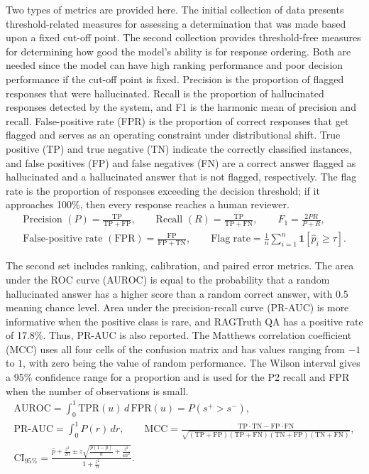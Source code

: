 \documentclass[a4paper,fleqn]{cas-sc}
\begin{document}
Two types of metrics are provided here. The initial collection of data presents threshold-related measures for assessing a determination that was made based upon a fixed cut-off point. The second collection provides threshold-free measures for determining how good the model's ability is for response ordering. Both are needed since the model can have high ranking performance and poor decision performance if the cut-off point is fixed. Precision is the proportion of flagged responses that were hallucinated. Recall is the proportion of hallucinated responses detected by the system, and F1 is the harmonic mean of precision and recall. False-positive rate (FPR) is the proportion of correct responses that get flagged and serves as an operating constraint under distributional shift. True positive (TP) and true negative (TN) indicate the correctly classified instances, and false positives (FP) and false negatives (FN) are a correct answer flagged as hallucinated and a hallucinated answer that is not flagged, respectively. The flag rate is the proportion of responses exceeding the decision threshold; if it approaches 100\%, then every response reaches a human reviewer.
\begin{gather}
  \text{Precision }(P) = \frac{\mathrm{TP}}{\mathrm{TP} + \mathrm{FP}}, \qquad
  \text{Recall }(R) = \frac{\mathrm{TP}}{\mathrm{TP} + \mathrm{FN}}, \qquad
  F_1 = \frac{2PR}{P+R}, \\
  \text{False-positive rate }(\mathrm{FPR}) = \frac{\mathrm{FP}}{\mathrm{FP} + \mathrm{TN}}, \qquad
  \text{Flag rate} = \frac{1}{n}\sum_{i=1}^{n}\mathbf{1}[\hat{p}_i \ge \tau].
\end{gather}

The second set includes ranking, calibration, and paired error metrics. The area under the ROC curve (AUROC) is equal to the probability that a random hallucinated answer has a higher score than a random correct answer, with 0.5 meaning chance level. Area under the precision-recall curve (PR-AUC) is more informative when the positive class is rare, and RAGTruth QA has a positive rate of 17.8\%. Thus, PR-AUC is also reported. The Matthews correlation coefficient (MCC) uses all four cells of the confusion matrix and has values ranging from $-1$ to $1$, with zero being the value of random performance. The Wilson interval gives a 95\% confidence range for a proportion and is used for the P2 recall and FPR when the number of observations is small.
\begin{gather}
  \mathrm{AUROC} = \int_{0}^{1} \mathrm{TPR}(u)\, d\,\mathrm{FPR}(u) = P(s^{+} > s^{-}), \\
  \mathrm{PR\text{-}AUC} = \int_{0}^{1} P(r)\, dr, \qquad
  \mathrm{MCC} = \frac{\mathrm{TP}\cdot\mathrm{TN} - \mathrm{FP}\cdot\mathrm{FN}}{\sqrt{(\mathrm{TP}+\mathrm{FP})(\mathrm{TP}+\mathrm{FN})(\mathrm{TN}+\mathrm{FP})(\mathrm{TN}+\mathrm{FN})}}, \\
  \mathrm{CI}_{95\%} = \frac{\hat{p} + \frac{z^2}{2n} \pm z\sqrt{\frac{\hat{p}(1-\hat{p})}{n} + \frac{z^2}{4n^2}}}{1 + \frac{z^2}{n}}.
\end{gather}
\end{document}
